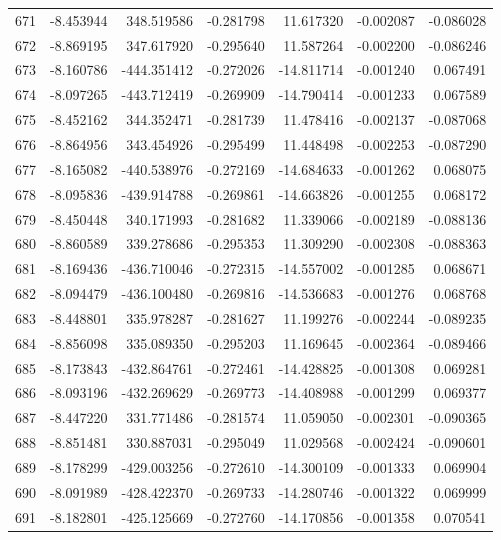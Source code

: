 \begin{tabular}{rrrrrrr}
 671 &  -8.453944 &  348.519586 & -0.281798 &   11.617320 &   -0.002087 & -0.086028 \\
 672 &  -8.869195 &  347.617920 & -0.295640 &   11.587264 &   -0.002200 & -0.086246 \\
 673 &  -8.160786 & -444.351412 & -0.272026 &  -14.811714 &   -0.001240 &  0.067491 \\
 674 &  -8.097265 & -443.712419 & -0.269909 &  -14.790414 &   -0.001233 &  0.067589 \\
 675 &  -8.452162 &  344.352471 & -0.281739 &   11.478416 &   -0.002137 & -0.087068 \\
 676 &  -8.864956 &  343.454926 & -0.295499 &   11.448498 &   -0.002253 & -0.087290 \\
 677 &  -8.165082 & -440.538976 & -0.272169 &  -14.684633 &   -0.001262 &  0.068075 \\
 678 &  -8.095836 & -439.914788 & -0.269861 &  -14.663826 &   -0.001255 &  0.068172 \\
 679 &  -8.450448 &  340.171993 & -0.281682 &   11.339066 &   -0.002189 & -0.088136 \\
 680 &  -8.860589 &  339.278686 & -0.295353 &   11.309290 &   -0.002308 & -0.088363 \\
 681 &  -8.169436 & -436.710046 & -0.272315 &  -14.557002 &   -0.001285 &  0.068671 \\
 682 &  -8.094479 & -436.100480 & -0.269816 &  -14.536683 &   -0.001276 &  0.068768 \\
 683 &  -8.448801 &  335.978287 & -0.281627 &   11.199276 &   -0.002244 & -0.089235 \\
 684 &  -8.856098 &  335.089350 & -0.295203 &   11.169645 &   -0.002364 & -0.089466 \\
 685 &  -8.173843 & -432.864761 & -0.272461 &  -14.428825 &   -0.001308 &  0.069281 \\
 686 &  -8.093196 & -432.269629 & -0.269773 &  -14.408988 &   -0.001299 &  0.069377 \\
 687 &  -8.447220 &  331.771486 & -0.281574 &   11.059050 &   -0.002301 & -0.090365 \\
 688 &  -8.851481 &  330.887031 & -0.295049 &   11.029568 &   -0.002424 & -0.090601 \\
 689 &  -8.178299 & -429.003256 & -0.272610 &  -14.300109 &   -0.001333 &  0.069904 \\
 690 &  -8.091989 & -428.422370 & -0.269733 &  -14.280746 &   -0.001322 &  0.069999 \\
 691 &  -8.182801 & -425.125669 & -0.272760 &  -14.170856 &   -0.001358 &  0.070541 \\

\end{tabular}
